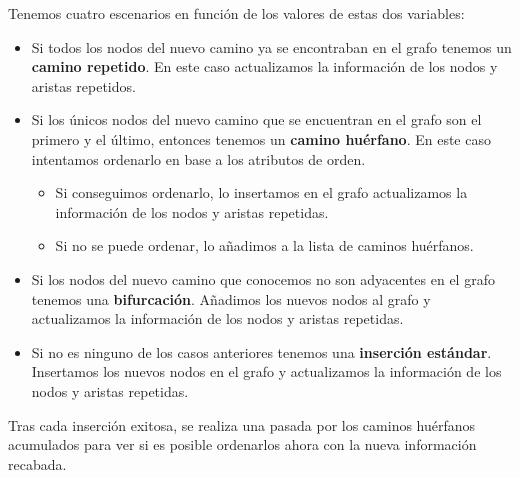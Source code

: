 \documentclass[twoside, 12pt]{epstfg}
\begin{document}
Tenemos cuatro escenarios en función de los valores de estas dos variables:
\begin{itemize}
    \item Si todos los nodos del nuevo camino ya se encontraban en el grafo tenemos un \textbf{camino repetido}. En este caso actualizamos la información de los nodos y aristas repetidos.
    \item Si los únicos nodos del nuevo camino que se encuentran en el grafo son el primero y el último, entonces tenemos un \textbf{camino huérfano}. En este caso intentamos ordenarlo en base a los atributos de orden.
    \begin{itemize}
        \item Si conseguimos ordenarlo, lo insertamos en el grafo actualizamos la información de los nodos y aristas repetidas.
        \item Si no se puede ordenar, lo añadimos a la lista de caminos huérfanos.
    \end{itemize}
    \item Si los nodos del nuevo camino que conocemos no son adyacentes en el grafo tenemos una \textbf{bifurcación}. Añadimos los nuevos nodos al grafo y actualizamos la información de los nodos y aristas repetidas.
    \item Si no es ninguno de los casos anteriores tenemos una \textbf{inserción estándar}. Insertamos los nuevos nodos en el grafo y actualizamos la información de los nodos y aristas repetidas.
\end{itemize}
Tras cada inserción exitosa, se realiza una pasada por los caminos huérfanos acumulados para ver si es posible ordenarlos ahora con la nueva información recabada.
\end{document}

